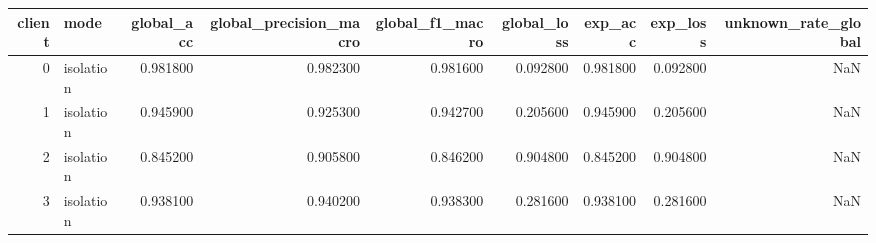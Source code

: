 \begin{tabular}{rlrrrrrrr}
\toprule
client & mode & global_acc & global_precision_macro & global_f1_macro & global_loss & exp_acc & exp_loss & unknown_rate_global \\
\midrule
0 & isolation & 0.981800 & 0.982300 & 0.981600 & 0.092800 & 0.981800 & 0.092800 & NaN \\
1 & isolation & 0.945900 & 0.925300 & 0.942700 & 0.205600 & 0.945900 & 0.205600 & NaN \\
2 & isolation & 0.845200 & 0.905800 & 0.846200 & 0.904800 & 0.845200 & 0.904800 & NaN \\
3 & isolation & 0.938100 & 0.940200 & 0.938300 & 0.281600 & 0.938100 & 0.281600 & NaN \\
\bottomrule
\end{tabular}
